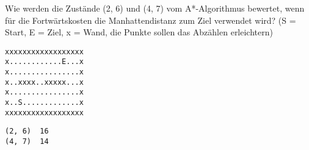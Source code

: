 \question[2]
Wie werden die Zustände (2, 6)  und  (4, 7) vom A*-Algorithmus
bewertet, wenn für die Fortwärtskosten die Manhattendistanz zum Ziel verwendet
wird? (S = Start, E = Ziel, x = Wand, die Punkte sollen das Abzählen erleichtern)
\begin{lstlisting}
xxxxxxxxxxxxxxxxxx
x............E...x
x................x
x..xxxx..xxxxx...x
x................x
x..S.............x
xxxxxxxxxxxxxxxxxx
\end{lstlisting}
\begin{solutionbox}{4cm}
\begin{lstlisting}
(2, 6)  16
(4, 7)  14
\end{lstlisting}
\end{solutionbox}
